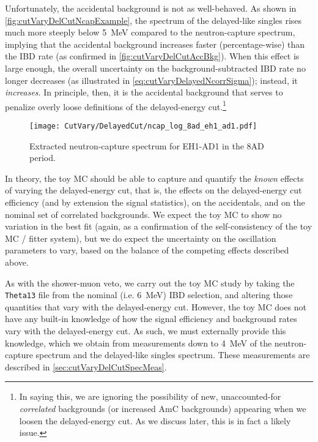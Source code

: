 \documentclass[../thesis.tex]{subfiles}
\begin{document}
Unfortunately, the accidental background is not as well-behaved. As shown in \autoref{fig:cutVaryDelCutNcapExample}, the spectrum of the delayed-like singles rises much more steeply below 5~MeV compared to the neutron-capture spectrum, implying that the accidental background increases faster (percentage-wise) than the IBD rate (as confirmed in \autoref{fig:cutVaryDelCutAccBkg}). When this effect is large enough, the overall uncertainty on the background-subtracted IBD rate no longer decreases (as illustrated in \autoref{eq:cutVaryDelayedNcorrSigma}); instead, it \emph{increases}. In principle, then, it is the accidental background that serves to penalize overly loose definitions of the delayed-energy cut.\footnote{In saying this, we are ignoring the possibility of new, unaccounted-for \emph{correlated} backgrounds (or increased AmC backgrounds) appearing when we loosen the delayed-energy cut. As we discuss later, this is in fact a likely issue.}

\begin{figure}[ht]
  \texttt{[image: CutVary/DelayedCut/ncap\_log\_8ad\_eh1\_ad1.pdf]}
  \caption{Extracted neutron-capture spectrum for EH1-AD1 in the 8AD period.}
  \label{fig:cutVaryDelCutNcapExample}
\end{figure}


In theory, the toy MC should be able to capture and quantify the \emph{known} effects of varying the delayed-energy cut, that is, the effects on the delayed-energy cut efficiency (and by extension the signal statistics), on the accidentals, and on the nominal set of correlated backgrounds. We expect the toy MC to show no variation in the best fit (again, as a confirmation of the self-consistency of the toy MC / fitter system), but we do expect the uncertainty on the oscillation parameters to vary, based on the balance of the competing effects described above.

As with the shower-muon veto, we carry out the toy MC study by taking the \texttt{Theta13} file from the nominal (i.e. 6~MeV) IBD selection, and altering those quantities that vary with the delayed-energy cut. However, the toy MC does not have any built-in knowledge of how the signal efficiency and background rates vary with the delayed-energy cut. As such, we must externally provide this knowledge, which we obtain from measurements down to 4~MeV of the neutron-capture spectrum and the delayed-like singles spectrum. These measurements are described in \autoref{sec:cutVaryDelCutSpecMeas}.
\end{document}
